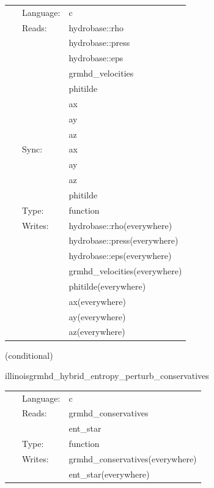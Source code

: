 \documentclass{article}
\begin{document}
 \begin{tabular*}{160mm}{cll} 
~ & Language:  & c \\ 
~ & Reads:  & hydrobase::rho \\ 
~& ~ &hydrobase::press\\ 
~& ~ &hydrobase::eps\\ 
~& ~ &grmhd\_velocities\\ 
~& ~ &phitilde\\ 
~& ~ &ax\\ 
~& ~ &ay\\ 
~& ~ &az\\ 
~ & Sync:  & ax \\ 
~& ~ &ay\\ 
~& ~ &az\\ 
~& ~ &phitilde\\ 
~ & Type:  & function \\ 
~ & Writes:  & hydrobase::rho(everywhere) \\ 
~& ~ &hydrobase::press(everywhere)\\ 
~& ~ &hydrobase::eps(everywhere)\\ 
~& ~ &grmhd\_velocities(everywhere)\\ 
~& ~ &phitilde(everywhere)\\ 
~& ~ &ax(everywhere)\\ 
~& ~ &ay(everywhere)\\ 
~& ~ &az(everywhere)\\ 
\end{tabular*} 


\vspace{5mm}

   (conditional) 

\hspace{5mm} illinoisgrmhd\_hybrid\_entropy\_perturb\_conservatives 

\hspace{5mm}{\it entropy+hybrid version of illinoisgrmhd\_perturb\_conservatives } 


\hspace{5mm}

 \begin{tabular*}{160mm}{cll} 
~ & Language:  & c \\ 
~ & Reads:  & grmhd\_conservatives \\ 
~& ~ &ent\_star\\ 
~ & Type:  & function \\ 
~ & Writes:  & grmhd\_conservatives(everywhere) \\ 
~& ~ &ent\_star(everywhere)\\ 
\end{tabular*} 
\end{document}
